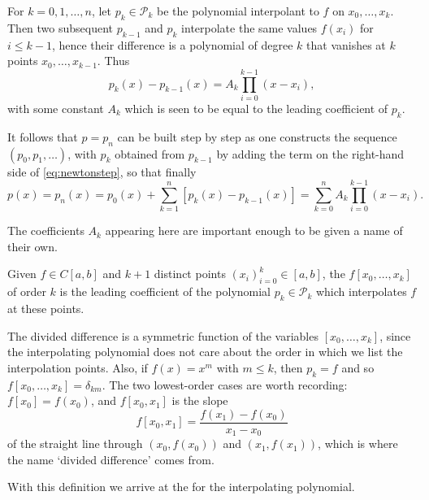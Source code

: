 \documentclass[a4paper]{scrartcl}
\begin{document}
\begin{method}
For $k=0,1, \ldots, n$, let $p_{k} \in \mathcal{P}_{k}$ be the polynomial interpolant to $f$ on $x_{0}, \ldots, x_{k}$. Then two subsequent $p_{k-1}$ and $p_{k}$ interpolate the same values $f\left(x_{i}\right)$ for $i \leq k-1$, hence their difference is a polynomial of degree $k$ that vanishes at $k$ points $x_{0}, \ldots, x_{k-1}$. Thus
\begin{equation}\label{eq:newtonstep}
p_{k}(x)-p_{k-1}(x)=A_{k} \prod_{i=0}^{k-1}\left(x-x_{i}\right),
\end{equation}
with some constant $A_{k}$ which is seen to be equal to the leading coefficient of $p_{k}$.

It follows that $p=p_{n}$ can be built step by step as one constructs the sequence $\left(p_{0}, p_{1}, \ldots\right)$, with $p_{k}$ obtained from $p_{k-1}$ by adding the term on the right-hand side of \eqref{eq:newtonstep}, so that finally
$$
p(x)=p_{n}(x)=p_{0}(x)+\sum_{k=1}^{n}\left[p_{k}(x)-p_{k-1}(x)\right]=\sum_{k=0}^{n} A_{k} \prod_{i=0}^{k-1}\left(x-x_{i}\right).
$$
\end{method}

The coefficients $A_k$ appearing here are important enough to be given a name of their own.

\begin{definition}
Given $f \in C[a, b]$ and $k+1$ distinct points $\left(x_{i}\right)_{i=0}^{k} \in[a, b]$, the  $f\left[x_{0}, \ldots, x_{k}\right]$ of order $k$ is the leading coefficient of the polynomial $p_{k} \in \mathcal{P}_{k}$ which interpolates $f$ at these points.
\end{definition}

The divided difference is a symmetric function of the variables $\left[x_{0}, \ldots, x_{k}\right]$, since the interpolating polynomial does not care about the order in which we list the interpolation points. Also, if $f(x)=x^{m}$ with $m \leq k$, then $p_k = f$ and so $f\left[x_{0}, \ldots, x_{k}\right]=\delta_{k m}$. The two lowest-order cases are worth recording: $f[x_0] = f(x_0)$, and $f[x_0, x_1]$ is the slope
$$
f[x_0, x_1] = \frac{f(x_1) - f(x_0)}{x_1 - x_0}
$$
of the straight line through $(x_0, f(x_0))$ and $(x_1, f(x_1))$, which is where the name `divided difference' comes from.

With this definition we arrive at the  for the interpolating polynomial.
\end{document}
